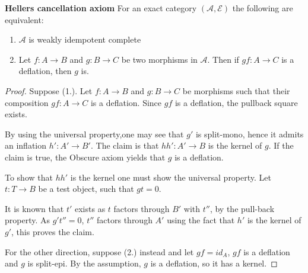     \begin{prop} \textbf{Hellers cancellation axiom}
        For an exact category $(\mathcal{A},\mathcal{E})$ the following are equivalent:
        \begin{enumerate}
            \item $\mathcal{A}$ is weakly idempotent complete
            \item Let $f: A\rightarrow B$ and $g: B\rightarrow C$ be two morphisms in $\mathcal{A}$. Then if $gf:A\rightarrow C$ is a deflation, then $g$ is.
        \end{enumerate}
    \end{prop}

    \begin{proof}
        Suppose (1.). Let $f:A\rightarrow B$ and $g:B\rightarrow C$ be morphisms such that their composition $gf:A\rightarrow C$ is a deflation. Since $gf$ is a deflation, the pullback square exists.

        \begin{center}
        \end{center}

        By using the universal property,one may see that $g'$ is split-mono, hence it admits an inflation $h':A'\rightarrow B'$. The claim is that $hh':A'\rightarrow B$ is the kernel of $g$. If the claim is true, the Obscure axiom yields that $g$ is a deflation.

        To show that $hh'$ is the kernel one must show the universal property. Let $t:T\rightarrow B$ be a test object, such that $gt=0$.

        \begin{center}
        \end{center}

       It is known that $t'$ exists as $t$ factors through $B'$ with $t''$, by the pull-back property. As $g't''=0$, $t''$ factors through $A'$ using the fact that $h'$ is the kernel of $g'$, this proves the claim.
        
        For the other direction, suppose (2.) instead and let $gf=id_A$,  $gf$ is a deflation and $g$ is split-epi. By the assumption, $g$ is a deflation, so it has a kernel.
    \end{proof}

